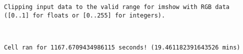 \documentclass[11pt]{article}
\begin{document}
    \begin{Verbatim}[commandchars=\\\{\}]
Clipping input data to the valid range for imshow with RGB data ([0..1] for floats or [0..255] for integers).

    \end{Verbatim}

    \begin{center}
    \end{center}
    { \hspace*{\fill} \\}
    
    \begin{Verbatim}[commandchars=\\\{\}]
Cell ran for 1167.6709434986115 seconds! (19.461182391643526 mins)

    \end{Verbatim}
\end{document}
